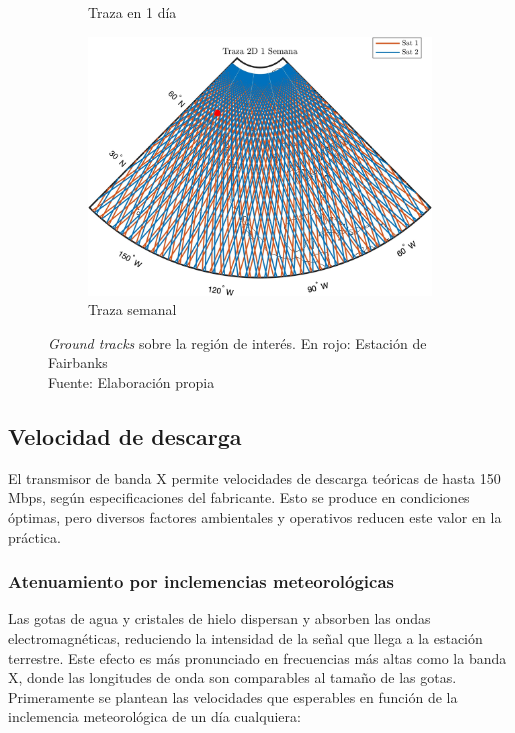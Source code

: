 \begin{figure}[H]
\begin{subfigure}[b]{0.3\textwidth}
        \caption{Traza en 1 día}
        \label{fig:traza2}
    \end{subfigure}
    \hfill
    \begin{subfigure}[b]{0.3\textwidth}
        \centering
        \includegraphics[width=\textwidth]{7.Segmento_Tierra/Traza 2D 1 Semana.jpg}
        \caption{Traza semanal}
        \label{fig:traza3}
    \end{subfigure}
    \caption{\textit{Ground tracks} sobre la región de interés. En rojo: Estación de Fairbanks \\ Fuente: Elaboración propia}
    \label{fig:conjunta}
\end{figure}


\subsection{Velocidad de descarga}\label{sec:downlink}



El transmisor de banda X permite velocidades de descarga teóricas de hasta 150 Mbps, según especificaciones del fabricante. Esto se produce en condiciones óptimas, pero diversos factores ambientales y operativos reducen este valor en la práctica.

\subsubsection{Atenuamiento por inclemencias meteorológicas}

Las gotas de agua y cristales de hielo dispersan y absorben las ondas electromagnéticas, reduciendo la intensidad de la señal que llega a la estación terrestre. Este efecto es más pronunciado en frecuencias más altas como la banda X, donde las longitudes de onda son comparables al tamaño de las gotas. Primeramente se plantean las velocidades que esperables en función de la inclemencia meteorológica de un día cualquiera:

